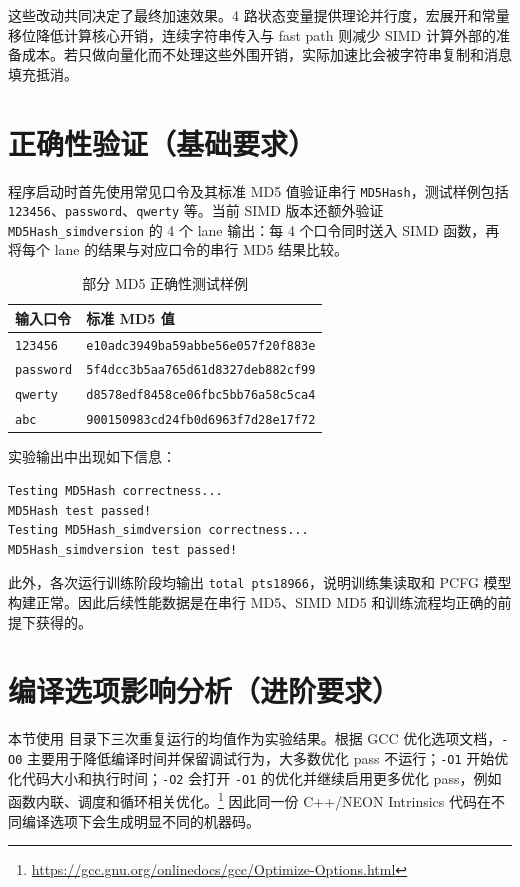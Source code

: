 \documentclass[UTF8,a4paper,12pt]{ctexart}
\begin{document}
这些改动共同决定了最终加速效果。4 路状态变量提供理论并行度，宏展开和常量移位降低计算核心开销，连续字符串传入与 fast path 则减少 SIMD 计算外部的准备成本。若只做向量化而不处理这些外围开销，实际加速比会被字符串复制和消息填充抵消。

\section{正确性验证（基础要求）}

程序启动时首先使用常见口令及其标准 MD5 值验证串行 \texttt{MD5Hash}，测试样例包括 \texttt{123456}、\texttt{password}、\texttt{qwerty} 等。当前 SIMD 版本还额外验证 \texttt{MD5Hash\_simdversion} 的 4 个 lane 输出：每 4 个口令同时送入 SIMD 函数，再将每个 lane 的结果与对应口令的串行 MD5 结果比较。

\begin{table}[H]
    \centering
    \caption{部分 MD5 正确性测试样例}
    \small
    \begin{tabular}{ll}
        \toprule
        输入口令 & 标准 MD5 值 \\
        \midrule
        \texttt{123456} & \texttt{e10adc3949ba59abbe56e057f20f883e} \\
        \texttt{password} & \texttt{5f4dcc3b5aa765d61d8327deb882cf99} \\
        \texttt{qwerty} & \texttt{d8578edf8458ce06fbc5bb76a58c5ca4} \\
        \texttt{abc} & \texttt{900150983cd24fb0d6963f7d28e17f72} \\
        \bottomrule
    \end{tabular}
\end{table}

实验输出中出现如下信息：

\begin{lstlisting}[style=cppstyle,caption={MD5 正确性验证输出}]
Testing MD5Hash correctness...
MD5Hash test passed!
Testing MD5Hash_simdversion correctness...
MD5Hash_simdversion test passed!
\end{lstlisting}

此外，各次运行训练阶段均输出 \texttt{total pts18966}，说明训练集读取和 PCFG 模型构建正常。因此后续性能数据是在串行 MD5、SIMD MD5 和训练流程均正确的前提下获得的。

\section{编译选项影响分析（进阶要求）}

本节使用  目录下三次重复运行的均值作为实验结果。根据 GCC 优化选项文档，\texttt{-O0} 主要用于降低编译时间并保留调试行为，大多数优化 pass 不运行；\texttt{-O1} 开始优化代码大小和执行时间；\texttt{-O2} 会打开 \texttt{-O1} 的优化并继续启用更多优化 pass，例如函数内联、调度和循环相关优化。\footnote{\url{https://gcc.gnu.org/onlinedocs/gcc/Optimize-Options.html}} 因此同一份 C++/NEON Intrinsics 代码在不同编译选项下会生成明显不同的机器码。
\end{document}
